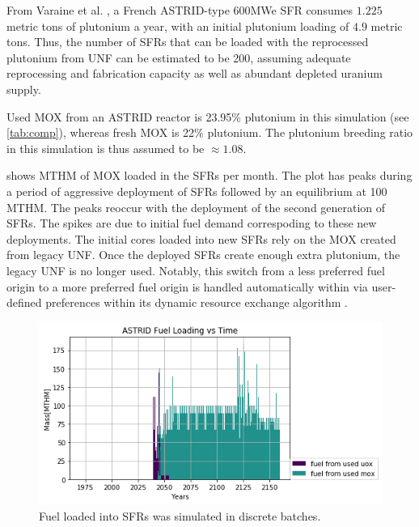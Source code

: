 From Varaine et al. \cite{varaine_pre-conceptual_2012}, a French
ASTRID-type 600\gls{MWe} \gls{SFR} consumes $1.225$ metric tons of
plutonium a year, with an initial plutonium loading of $4.9$ metric tons. 
Thus, the number of \glspl{SFR} that can be loaded with the reprocessed
plutonium from \gls{UNF} can be estimated to be 200, assuming adequate 
reprocessing and fabrication capacity as well as abundant depleted uranium 
supply.
 
Used \gls{MOX} from an ASTRID reactor is 23.95\% plutonium
in this simulation (see \cref{tab:comp}), whereas fresh \gls{MOX} is 22\% plutonium.
The plutonium breeding ratio in this simulation is thus assumed to be
$\approx 1.08$.


 shows MTHM of \gls{MOX} loaded in the \glspl{SFR} per month.  The plot 
has peaks during a period of aggressive deployment of \glspl{SFR} followed by 
an equilibrium at 100 \gls{MTHM}. The peaks reoccur with the deployment of the 
second generation of \glspl{SFR}.  The spikes are due to initial fuel demand 
correspoding to these new deployments.  The initial cores loaded into new 
\glspl{SFR} rely on the \gls{MOX} created from legacy \gls{UNF}. Once the 
deployed \glspl{SFR} create enough extra plutonium, the legacy \gls{UNF} is no 
longer used. Notably, this switch from a less preferred fuel origin to a more 
preferred fuel origin is handled automatically within \Cyclus via user-defined preferences 
within its dynamic resource exchange algorithm \cite{gidden_methodology_2016}.


\begin{figure}[htbp!]
    \begin{center}
        \includegraphics[scale=0.7]{./images/french-transition/where_fuel.png}
    \end{center}
    \caption{Fuel loaded into \glspl{SFR} was simulated in discrete 
        batches.}
    \label{fig:fuel}
\end{figure}

